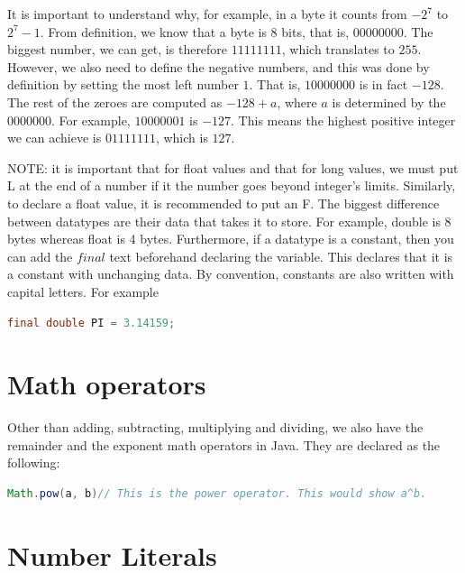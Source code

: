 \documentclass[11pt,a4 paper]{book}
\theoremstyle{plain}
\theoremstyle{definition}
\newtheorem{defn}{Definition}[section]
\theoremstyle{remark}
\begin{document}
\begin{flushleft}
\begin{tcolorbox}[colback=black!3!white,colframe=black!60!white,title=\begin{defn}How Number range is determined \label{How Number range is determined}\end{defn}]
It is important to understand why, for example, in a byte it counts from $-2^{7}$ to $2^{7}-1$.
From definition, we know that a byte is 8 bits, that is, $00000000$. The biggest number, we can get, is therefore $11111111$, which translates to $255$. However, we also need to define the negative numbers, and this was done by definition by setting the most left number $1 $. That is, $10000000$ is in fact $-128$. The rest of the zeroes are computed as $-128+a$, where $a$ is determined by the $0000000$. For example, $10000001$ is $-127$. This means the highest positive integer we can achieve is  $01111111$, which is $127$. 
\end{tcolorbox}
NOTE: it is important that for float values and that for long values, we must put L at the end of a number if it the number goes beyond integer's limits. Similarly, to declare a float value, it is recommended to put an F.
The biggest difference between datatypes are their data that takes it to store. For example, double is 8 bytes whereas float is 4 bytes. Furthermore, if a datatype is a constant, then you can add the $final$ text beforehand declaring the variable. This declares that it is a constant with unchanging data. By convention, constants are also written with capital letters. For example
\begin{lstlisting}[language=Java]
final double PI = 3.14159;
\end{lstlisting}
\section{Math operators}
Other than adding, subtracting, multiplying and dividing, we also have the remainder and the exponent math operators in Java. They are declared as the following:
\begin{lstlisting}[language=Java]
% // This is the remainder operator. For example, 5 % 3 would give out 2.
Math.pow(a, b)// This is the power operator. This would show a^b.
\end{lstlisting}
\section{Number Literals}

\end{flushleft}
\end{document}
